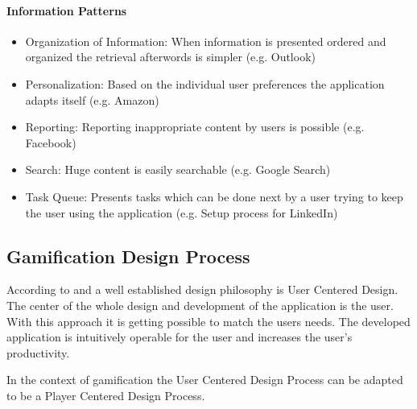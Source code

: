 \paragraph*{Information Patterns}
\begin{itemize}
	\item Organization of Information: When information is presented ordered and organized the retrieval afterwords is simpler (e.g. Outlook) \cite[p. 6, 85, 86]{lewisIrresistibleAppsMotivational2014}
	\item Personalization: Based on the individual user preferences the application adapts itself (e.g. Amazon) \cite[p. 6, 87]{lewisIrresistibleAppsMotivational2014}
	\item Reporting: Reporting inappropriate content by users is possible (e.g. Facebook) \cite[p. 6, 90]{lewisIrresistibleAppsMotivational2014}
	\item Search: Huge content is easily searchable (e.g. Google Search) \cite[p. 6, 90, 91]{lewisIrresistibleAppsMotivational2014}
	\item Task Queue: Presents tasks which can be done next by a user trying to keep the user using the application (e.g. Setup process for LinkedIn) \cite[p. 6, 93]{lewisIrresistibleAppsMotivational2014}
\end{itemize}

\newpage

\subsection{Gamification Design Process}
\label{sec:theoryBd}

According to \cite[p. 5, 6]{lowdermilkUsercenteredDesignDevelopers2013} and \cite[p. 27, 28]{kumarGamificationWorkDesigning2013} a well established design philosophy is User Centered Design. The center of the whole design and development of the application is the user. With this approach it is getting possible to match the users needs. The developed application is intuitively operable for the user and increases the user's productivity.

In the context of gamification the User Centered Design Process can be adapted to be a Player Centered Design Process.  


